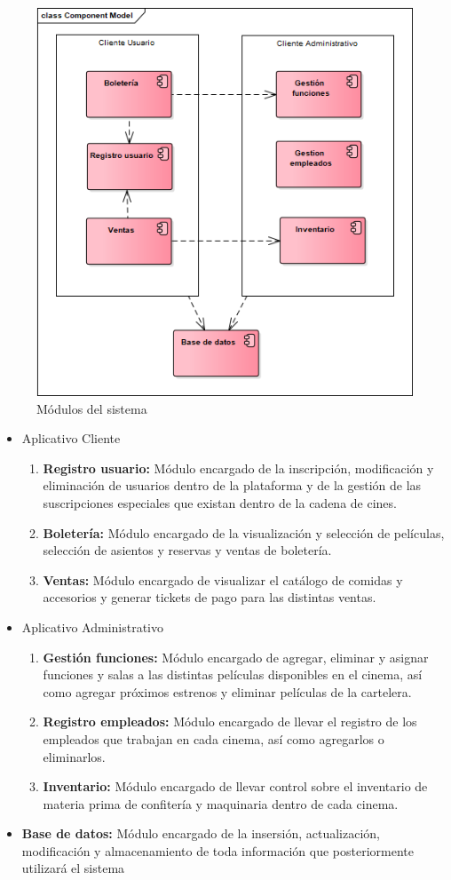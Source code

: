 \begin{figure}[h!]
	\centering
\includegraphics[width=0.7\linewidth]{proyecto/proceso/imgs/modulos}
	\caption{Módulos del sistema}
\end{figure}


\begin{itemize}
	\item{Aplicativo Cliente}
		\begin{enumerate}
			\item{\textbf{Registro usuario:} Módulo encargado de la inscripción, modificación y eliminación de usuarios dentro de la plataforma y de la gestión de las suscripciones especiales que existan dentro de la cadena de cines.}
			\item{\textbf{Boletería:} Módulo encargado de la visualización y selección de películas, selección de asientos y reservas y ventas de boletería.}
			\item{\textbf{Ventas:} Módulo encargado de visualizar el catálogo de comidas y accesorios y generar tickets de pago para las distintas ventas.}
		\end{enumerate}
		\leavevmode
		\linebreak
	\item{Aplicativo Administrativo}
		\begin{enumerate}
			\item{\textbf{Gestión funciones:} Módulo encargado de agregar, eliminar y asignar funciones y salas a las distintas películas disponibles en el cinema, así como agregar próximos estrenos y eliminar películas de la cartelera.}
			\item{\textbf{Registro empleados:} Módulo encargado de llevar el registro de los empleados que trabajan en cada cinema, así como agregarlos o eliminarlos.}
			\item{\textbf{Inventario:} Módulo encargado de llevar control sobre el inventario de materia prima de confitería y maquinaria dentro de cada cinema.}
		\end{enumerate}
		\leavevmode
		\linebreak
	\item{\textbf{Base de datos:} Módulo encargado de la insersión, actualización, modificación y almacenamiento de toda información que posteriormente utilizará el sistema}
\end{itemize}

